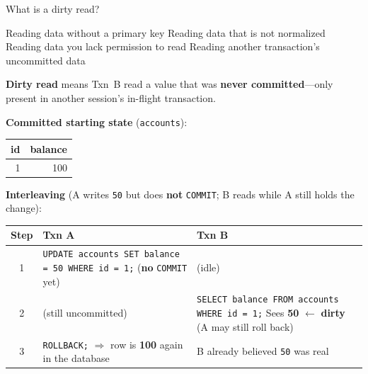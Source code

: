 \question[4]
What is a dirty read?
\begin{choices}
  \choice Reading data without a primary key
  \choice Reading data that is not normalized
  \choice Reading data you lack permission to read
  \CorrectChoice Reading another transaction's uncommitted data
\end{choices}
\begin{solution}
  \textbf{Dirty read} means Txn~B read a value that was \textbf{never committed}---only present in another session's in-flight transaction.

  \medskip
  \noindent\textbf{Committed starting state} (\texttt{accounts}):

  \begin{center}
  \footnotesize
  \begin{tabular}{|r|r|}
    \hline
    \textbf{id} & \textbf{balance} \\
    \hline
    1 & 100 \\
    \hline
  \end{tabular}
  \end{center}

  \noindent\textbf{Interleaving} (A writes \texttt{50} but does \textbf{not} \texttt{COMMIT}; B reads while A still holds the change):

  \begin{center}
  \footnotesize
  \renewcommand{\arraystretch}{1.12}
  \begin{tabular}{|c|p{}|p{}|}
    \hline
    \textbf{Step} & \textbf{Txn A} & \textbf{Txn B} \\
    \hline
    1 &
    \texttt{UPDATE accounts SET balance = 50 WHERE id = 1;}\newline
    (\textbf{no} \texttt{COMMIT} yet) &
    (idle) \\
    \hline
    2 &
    (still uncommitted) &
    \texttt{SELECT balance FROM accounts WHERE id = 1;}\newline
    Sees \textbf{50} $\leftarrow$ \textbf{dirty} (A may still roll back) \\
    \hline
    3 &
    \texttt{ROLLBACK;} $\Rightarrow$ row is \textbf{100} again in the database &
    B already believed \texttt{50} was real \\
    \hline
  \end{tabular}
  \renewcommand{\arraystretch}{1}
  \end{center}


\end{solution}
